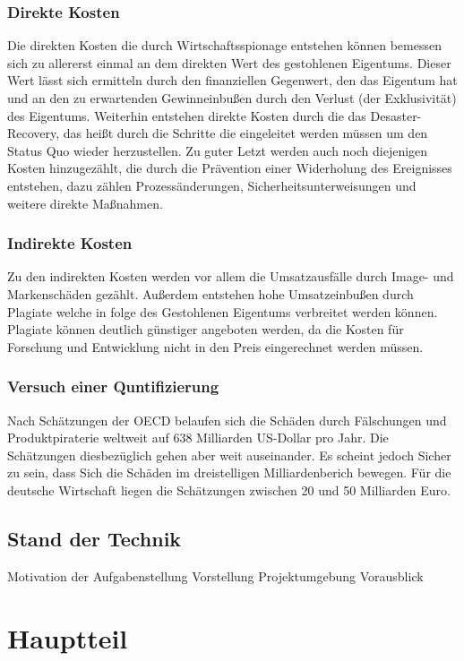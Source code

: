 \documentclass[
a4paper,   
titlepage,  
halfparskip,
12pt        
]{scrartcl}
\begin{document}
\begin{onehalfspacing}
\subsubsection{Direkte Kosten}
Die direkten Kosten die durch Wirtschaftsspionage entstehen können bemessen sich zu allererst einmal an dem direkten Wert des gestohlenen Eigentums. Dieser Wert lässt sich ermitteln durch den finanziellen Gegenwert, den das Eigentum hat und an den zu erwartenden Gewinneinbußen durch den Verlust (der Exklusivität) des Eigentums. Weiterhin entstehen direkte Kosten durch die das Desaster-Recovery, das heißt durch die Schritte die eingeleitet werden müssen um den Status Quo wieder herzustellen. Zu guter Letzt werden auch noch diejenigen Kosten hinzugezählt, die durch die Prävention einer Widerholung des Ereignisses entstehen, dazu zählen Prozessänderungen, Sicherheitsunterweisungen und weitere direkte Maßnahmen.\cite[S. 13]{kosten}
\subsubsection{Indirekte Kosten}
Zu den indirekten Kosten werden vor allem die Umsatzausfälle durch Image- und Markenschäden gezählt. Außerdem entstehen hohe Umsatzeinbußen durch Plagiate welche in folge des Gestohlenen Eigentums verbreitet werden können. Plagiate können deutlich günstiger angeboten werden, da die Kosten für Forschung und Entwicklung nicht in den Preis eingerechnet werden müssen.\cite[S. 14]{kosten}
\subsubsection{Versuch einer Quntifizierung}
Nach Schätzungen der \ac{OECD} belaufen sich die Schäden durch Fälschungen und Produktpiraterie weltweit auf 638 Milliarden US-Dollar pro Jahr. Die Schätzungen diesbezüglich gehen aber weit auseinander. Es scheint jedoch Sicher zu sein, dass Sich die Schäden im dreistelligen Milliardenberich bewegen. Für die deutsche Wirtschaft liegen die Schätzungen zwischen 20 und 50 Milliarden Euro.\cite[S. 16f]{kosten}

\subsection{Stand der Technik}
\label{subsec:stand}


Motivation der Aufgabenstellung
Vorstellung Projektumgebung
Vorausblick

\section{Hauptteil}
\label{sec:Hauptteil}


\end{onehalfspacing}
\end{document}
